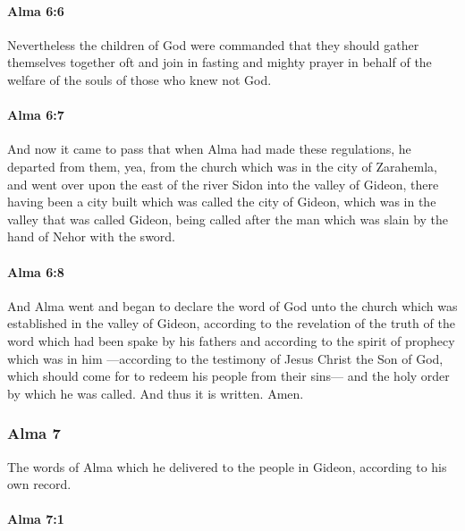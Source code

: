 		\paragraph{Alma 6:6} %
			\label{ALMA-6-6}

			Nevertheless the children of God were commanded
			that they should gather themselves together oft
			and join in fasting and mighty prayer
			in behalf of the welfare of the souls of those who knew not God.

		\paragraph{Alma 6:7} %
			\label{ALMA-6-7}

			And now it came to pass that
			when Alma had made these regulations,
			he departed from them,
			yea, from the church which was in the city of Zarahemla,
			and went over upon the east of the river Sidon into the valley of Gideon,
			there having been a city built which was called the city of Gideon,
			which was in the valley that was called Gideon,
			being called after the man which was slain by the hand of Nehor with the sword.

		\paragraph{Alma 6:8} %
			\label{ALMA-6-8}

			And Alma went and began to declare the word of God
			unto the church which was established in the valley of Gideon,
			according to the revelation of the truth of the word
			which had been spake by his fathers
			and according to the spirit of prophecy which was in him
			---according to the testimony of Jesus Christ the Son of God,
			which should come for to redeem his people from their sins---
			and the holy order by which he was called.
			And thus it is written.
			Amen.

	\subsubsection{Alma 7} %
		\label{ALMA-7}
		
		The words of Alma which he delivered to the people in Gideon,
		according to his own record.
		
		\paragraph{Alma 7:1} %
			\label{ALMA-7-1}

